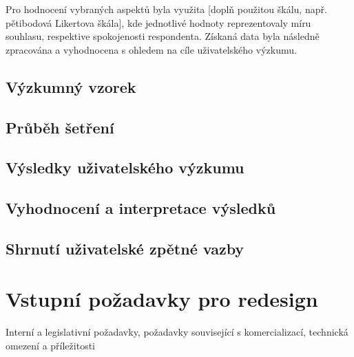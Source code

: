 Pro hodnocení vybraných aspektů byla využita [doplň použitou škálu, např. pětibodová Likertova škála], kde jednotlivé hodnoty reprezentovaly míru souhlasu, respektive spokojenosti respondenta. Získaná data byla následně zpracována a vyhodnocena s ohledem na cíle uživatelského výzkumu.

\subsection{Výzkumný vzorek}

\subsection{Průběh šetření}

\subsection{Výsledky uživatelského výzkumu}

\subsection{Vyhodnocení a interpretace výsledků}

\subsection{Shrnutí uživatelské zpětné vazby}

\section{Vstupní požadavky pro redesign}
Interní a legislativní požadavky, požadavky související s komercializací, technická omezení a příležitosti
